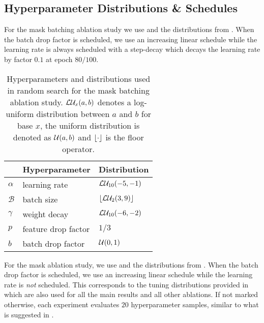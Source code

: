 \subsection{Hyperparameter Distributions \& Schedules}
\label{sec:abl-distr}
For the mask batching ablation study we use \adam \cite{Kingma2015} and the distributions from . When the batch drop factor is scheduled, we use an increasing linear schedule while the learning rate is always scheduled with a step-decay which decays the learning rate by factor $0.1$ at epoch $80/100$.
\begin{table}[t]
    \centering
    \begin{tabular}{lll}
        \toprule
         & \textbf{Hyperparameter} & \textbf{Distribution} \\
        \midrule
        $\alpha$ & learning rate & $\mathcal{L}\mathcal{U}_{10}(-5, -1)$ \\
        $\mathcal{B}$ & batch size  & $\lfloor\mathcal{L}\mathcal{U}_{2}(3, 9)\rfloor$ \\
        $\gamma$ & weight decay  & $\mathcal{L}\mathcal{U}_{10}(-6, -2)$ \\
        $p$ & feature drop factor  & $1/3$ \\
        $b$ & batch drop factor  & $\mathcal{U}(0, 1)$ \\
         \bottomrule 
    \end{tabular}
    \caption[Hyperparameters and distributions used for the mask batching ablation study]{Hyperparameters and distributions used in random search for the mask batching ablation study. $\mathcal{L}\mathcal{U}_{x}(a, b)$ denotes a log-uniform distribution between $a$ and $b$ for base $x$, the uniform distribution is denoted as $\mathcal{U}(a, b)$ and $\lfloor\cdot\rfloor$ is the floor operator.}
    \label{tab:abl-distributions-mask-batching}
\end{table}

For the mask ablation study, we use \adam \cite{Kingma2015} and the distributions from . When the batch drop factor is scheduled, we use an increasing linear schedule while the learning rate is \emph{not} scheduled. This corresponds to the tuning distributions provided in \domainbed which are also used for all the main results and all other ablations. If not marked otherwise, each experiment evaluates $20$ hyperparameter samples, similar to what is suggested in \domainbed.


